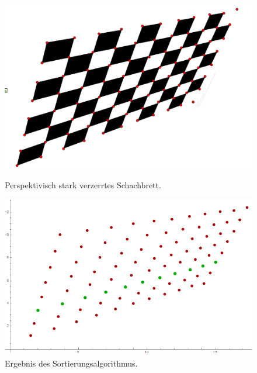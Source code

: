 \begin{figure}[!htb]
	\includegraphics[width=\linewidth]{images/perspektivisch.png}
	\caption[Perspektivisch stark verzerrtes Schachbrett]{Perspektivisch stark verzerrtes Schachbrett.}
	\label{fig:Extreme3}
	\endminipage\hfill
	\includegraphics[width=\linewidth]{images/AlgPerspektifisch.png}
	\caption[Sortierte Punkte eines perspektivisch verzerrten Schachbretts]{Ergebnis des Sortierungsalgorithmus.}
	\label{fig:Extreme4}
	\endminipage\hfill
\end{figure}


